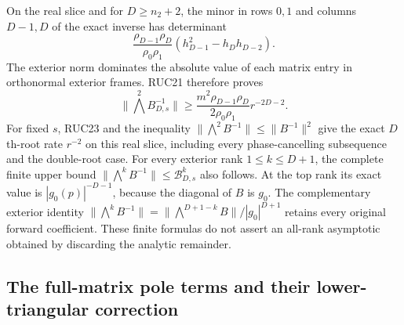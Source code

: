 \documentclass[11pt]{article}
\begin{document}
On the real slice and for $D\ge n_2+2$, the minor in rows $0,1$
and columns $D-1,D$ of the exact inverse has determinant
\[
 \frac{\rho_{D-1}\rho_D}{\rho_0\rho_1}
                (h_{D-1}^2-h_Dh_{D-2}).
\]
The exterior norm dominates the absolute value of each matrix
entry in orthonormal exterior frames.  RUC21 therefore proves
\[
 \|\bigwedge^2B_{D,s}^{-1}\|
 \ge\frac{m^2\rho_{D-1}\rho_D}{2\rho_0\rho_1}
                  r^{-2D-2}.
 \tag{RUC25}
\]
For fixed $s$, RUC23 and the inequality
$\|\bigwedge^2B^{-1}\|\le\|B^{-1}\|^2$ give the exact
$D$th-root rate $r^{-2}$ on this real slice, including every
phase-cancelling subsequence and the double-root case.
For every exterior rank $1\le k\le D+1$, the complete finite
upper bound $\|\bigwedge^k B^{-1}\|\le\mathcal B_{D,s}^k$
also follows.  At the top rank its exact value is
$|g_0(p)|^{-D-1}$, because the diagonal of $B$ is $g_0$.
The complementary exterior identity
$\|\bigwedge^kB^{-1}\|=
\|\bigwedge^{D+1-k}B\|/|g_0|^{D+1}$
retains every original forward coefficient.  These finite
formulas do not assert an all-rank asymptotic obtained by
discarding the analytic remainder.

\subsection{The full-matrix pole terms and their lower-triangular correction}
\end{document}
